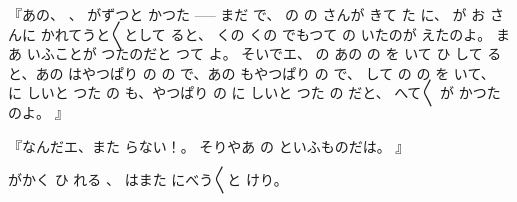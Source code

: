 『あの、
、
がずつと
かつた
\------ まだ
で、
の
の
さんが
きて
た
に、
が
お
さんに
かれてうと〳〵として
ると、
くの
くの
でもつて
の
いたのが
えたのよ。
まあ
いふことが
つたのだと
つて
よ。
そいでエ、
の
あの
の
を
いて
ひ
して
ると、あの
はやつぱり
の
の
で、あの
もやつぱり
の
で、
して
の
の
を
いて、
に
しいと
つた
の
も、やつぱり
の
に
しいと
つた
の
だと、
へて〳〵
が
かつたのよ。
』

『なんだエ、また
らない！。
そりやあ
の
といふものだは。
』

がかく
ひ
れる
、
はまた
にべう〳〵と
けり。

